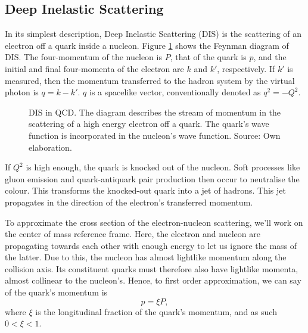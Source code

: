 \subsection{Deep Inelastic Scattering} \label{sec::dis}
    In its simplest description, Deep Inelastic Scattering (DIS) is the scattering of an electron off a quark inside a nucleon.
    Figure \ref{fig::dis_diagram} shows the Feynman diagram of DIS.
    The four-momentum of the nucleon is $P$, that of the quark is $p$, and the initial and final four-momenta of the electron are $k$ and $k'$, respectively.
    If $k'$ is measured, then the momentum transferred to the hadron system by the virtual photon is $q = k - k'$.
    $q$ is a spacelike vector, conventionally denoted as $q^2 = -Q^2$.

    \begin{figure}[h!]
        \centering{}
        \caption[DIS in QCD.]{DIS in QCD. The diagram describes the stream of momentum in the scattering of a high energy electron off a quark. The quark's wave function is incorporated in the nucleon's wave function. Source: Own elaboration.}
        \label{fig::dis_diagram}
    \end{figure}

    If $Q^2$ is high enough, the quark is knocked out of the nucleon.
    Soft processes like gluon emission and quark-antiquark pair production then occur to neutralise the colour.
    This transforms the knocked-out quark into a jet of hadrons.
    This jet propagates in the direction of the electron's transferred momentum.

    To approximate the cross section of the electron-nucleon scattering, we'll work on the center of mass reference frame.
    Here, the electron and nucleon are propagating towards each other with enough energy to let us ignore the mass of the latter.
    Due to this, the nucleon has almost lightlike momentum along the collision axis.
    Its constituent quarks must therefore also have lightlike momenta, almost collinear to the nucleon's.
    Hence, to first order approximation, we can say of the quark's momentum is
    \begin{equation*}
        p = \xi P,
    \end{equation*}
    where $\xi$ is the longitudinal fraction of the quark's momentum, and as such $0 < \xi < 1$.

